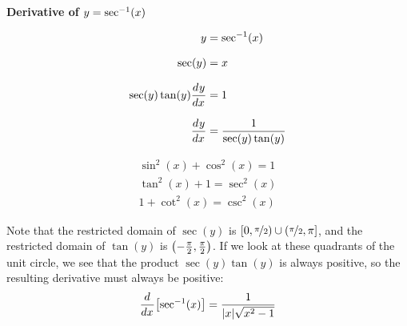 \documentclass[mathNotesPreamble]{subfiles}
\begin{document}
\noindent
{}

\noindent
\textbf{Derivative of $y=\sec^{-1}(x)$}

\begin{center}
  \begin{minipage}{0.3\linewidth}
    \begin{align*}
      y&=\sec^{-1}(x)\\[7.5pt]
      \sec(y)&=x\\[7.5pt]
      \sec(y)\tan(y){\frac{d^{}y}{dx^{}}}&=1\\[7.5pt]
      {\frac{d^{}y}{dx^{}}}&=\frac{1}{\sec(y)\tan(y)}
    \end{align*}
  \end{minipage}%
  \hspace*{0.15\linewidth}
  \begin{minipage}{0.3\linewidth}
    
    \vspace*{-15pt}
    \begin{align*}
      \sin^2(x)+\cos^2(x)=1\\[7.5pt]
      \tan^2(x)+1=\sec^2(x)\\[7.5pt]
      1+\cot^2(x)=\csc^2(x)
    \end{align*}
  \end{minipage}%
\end{center}
Note that the restricted domain of $\sec(y)$ is $[0,\nicefrac{\pi}{2})\cup(\nicefrac{\pi}{2},\pi]$, and the restricted domain of $\tan(y)$ is ${\left(-\frac{\pi}{2},\frac{\pi}{2}\right)}$. If we look at these quadrants of the unit circle, we see that the product $\sec(y)\tan(y)$ is always positive, so the resulting derivative must always be positive:
  \[{\frac{d^{}}{dx^{}}}{\left[\sec^{-1}(x)\right]}=\frac{1}{{\left\vert x\right\vert}\sqrt{x^2-1}}\]
\pagebreak
\end{document}
